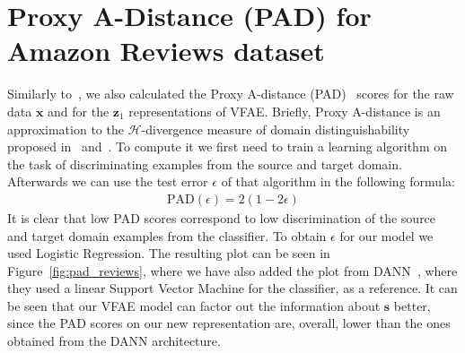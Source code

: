 \documentclass{article} %
\def\*#1{\mathbf{#1}}
\begin{document}
\section{Proxy A-Distance (PAD) for Amazon Reviews dataset}
Similarly to~\cite{2015arXiv150507818G}, we also calculated the Proxy A-distance (PAD)~\citep{ben2007analysis,ben2010theory} scores for the raw data $\*x$ and for the $\*z_1$ representations of VFAE. Briefly, Proxy A-distance is an approximation to the $\mathcal{H}$-divergence measure of domain distinguishability proposed in~\cite{kifer2004detecting} and~\cite{ben2007analysis,ben2010theory}. To compute it we first need to train a learning algorithm on the task of discriminating examples from the source and target domain. Afterwards we can use the test error $\epsilon$ of that algorithm in the following formula:
\begin{align*}
  \text{PAD}(\epsilon)  = 2(1 - 2\epsilon) 
\end{align*}
It is clear that low PAD scores correspond to low discrimination of the source and target domain examples from the classifier. To obtain $\epsilon$ for our model we used Logistic Regression. The resulting plot can be seen in Figure~\ref{fig:pad_reviews}, where we have also added the plot from DANN~\citep{2015arXiv150507818G}, where they used a linear Support Vector Machine for the classifier, as a reference. It can be seen that our VFAE model can factor out the information about $\*s$ better, since the PAD scores on our new representation are, overall, lower than the ones obtained from the DANN architecture.
\end{document}
